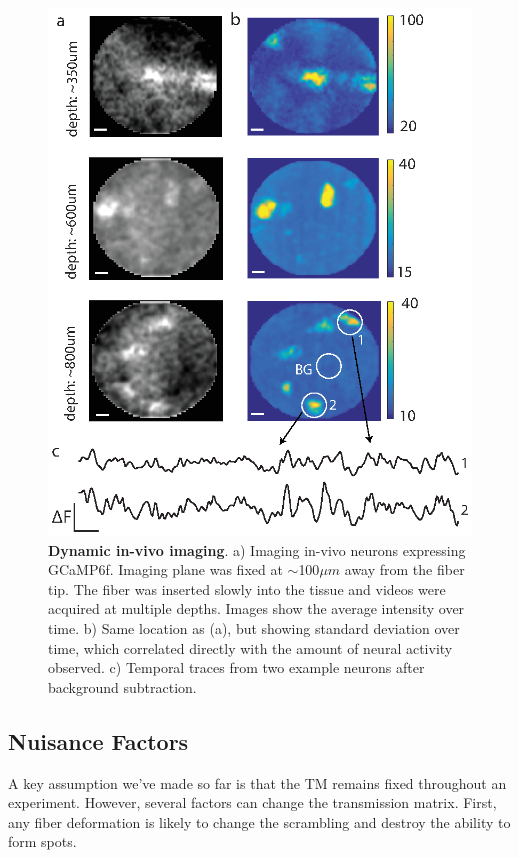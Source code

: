 \documentclass[10pt]{article}
\begin{document}
\begin{figure}
\centering\includegraphics[width=12cm]{figure12}
\caption{\textbf{Dynamic in-vivo imaging}.
a) Imaging in-vivo neurons expressing GCaMP6f. Imaging plane was fixed at $\sim$100$\mu m$ away from the fiber tip. The fiber was inserted slowly into the tissue and videos were acquired at multiple depths. Images show the average intensity over time. b) Same location as (a), but showing standard deviation over time, which correlated directly with the amount of neural activity observed. c) Temporal traces from two example neurons after background subtraction.  
}
\label{fig:figure12}
\end{figure}

\subsection{Nuisance Factors }\label{nuisance}
A key assumption we've made so far is that the TM remains fixed throughout an experiment. However, several factors can change the transmission matrix. First, any fiber deformation is likely to change the scrambling and destroy the ability to form spots.
\end{document}
